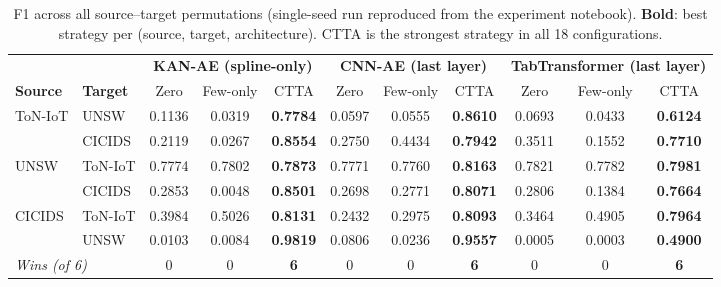 \documentclass[10pt, conference, letterpaper]{IEEEtran}
\begin{document}
\begin{table}[t]
\centering
\caption{F1 across all source--target permutations (single-seed run reproduced from the experiment notebook).
  \textbf{Bold}: best strategy per (source, target, architecture).
  CTTA is the strongest strategy in all 18 configurations.}
\label{tab:main_results}
\begin{tabular}{l|l|ccc|ccc|ccc}
\toprule
& & \multicolumn{3}{c|}{\textbf{KAN-AE (spline-only)}} & \multicolumn{3}{c|}{\textbf{CNN-AE (last layer)}} & \multicolumn{3}{c}{\textbf{TabTransformer (last layer)}} \\
\textbf{Source} & \textbf{Target} & Zero & Few-only & CTTA & Zero & Few-only & CTTA & Zero & Few-only & CTTA \\
\midrule
\multirow{2}{*}{ToN-IoT}
    & UNSW    & 0.1136 & 0.0319 & \textbf{0.7784} & 0.0597 & 0.0555 & \textbf{0.8610} & 0.0693 & 0.0433 & \textbf{0.6124} \\
    & CICIDS  & 0.2119 & 0.0267 & \textbf{0.8554} & 0.2750 & 0.4434 & \textbf{0.7942} & 0.3511 & 0.1552 & \textbf{0.7710} \\
\midrule
\multirow{2}{*}{UNSW}
    & ToN-IoT & 0.7774 & 0.7802 & \textbf{0.7873} & 0.7771 & 0.7760 & \textbf{0.8163} & 0.7821 & 0.7782 & \textbf{0.7981} \\
    & CICIDS  & 0.2853 & 0.0048 & \textbf{0.8501} & 0.2698 & 0.2771 & \textbf{0.8071} & 0.2806 & 0.1384 & \textbf{0.7664} \\
\midrule
\multirow{2}{*}{CICIDS}
    & ToN-IoT & 0.3984 & 0.5026 & \textbf{0.8131} & 0.2432 & 0.2975 & \textbf{0.8093} & 0.3464 & 0.4905 & \textbf{0.7964} \\
    & UNSW    & 0.0103 & 0.0084 & \textbf{0.9819} & 0.0806 & 0.0236 & \textbf{0.9557} & 0.0005 & 0.0003 & \textbf{0.4900} \\
\midrule
\multicolumn{2}{l|}{\textit{Wins (of 6)}} & 0 & 0 & \textbf{6} & 0 & 0 & \textbf{6} & 0 & 0 & \textbf{6} \\
\bottomrule
\end{tabular}
\end{table}
\end{document}
